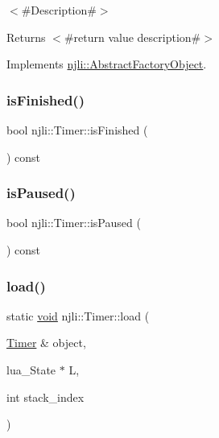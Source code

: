 $<$\#\+Description\#$>$

\begin{DoxyReturn}{Returns}
$<$\#return value description\#$>$ 
\end{DoxyReturn}


Implements \mbox{\hyperlink{classnjli_1_1_abstract_factory_object_a207c86146d40d0794708ae7f2d4e60a7}{njli\+::\+Abstract\+Factory\+Object}}.

\mbox{\label{classnjli_1_1_timer_a29750c69a007f00c7ecaf180b4fed52b}} 
\subsubsection{\texorpdfstring{is\+Finished()}{isFinished()}}
{\footnotesize\ttfamily bool njli\+::\+Timer\+::is\+Finished (\begin{DoxyParamCaption}{ }\end{DoxyParamCaption}) const}

\mbox{\label{classnjli_1_1_timer_a7184d3e27ef45550fbc07bb2580bb075}} 
\subsubsection{\texorpdfstring{is\+Paused()}{isPaused()}}
{\footnotesize\ttfamily bool njli\+::\+Timer\+::is\+Paused (\begin{DoxyParamCaption}{ }\end{DoxyParamCaption}) const}

\mbox{\label{classnjli_1_1_timer_acad9695415047e980e802f6048aefe6d}} 
\subsubsection{\texorpdfstring{load()}{load()}}
{\footnotesize\ttfamily static \mbox{\hyperlink{_thread_8h_af1e856da2e658414cb2456cb6f7ebc66}{void}} njli\+::\+Timer\+::load (\begin{DoxyParamCaption}\item[{\mbox{\hyperlink{classnjli_1_1_timer}{Timer}} \&}]{object,  }\item[{lua\+\_\+\+State $\ast$}]{L,  }\item[{int}]{stack\+\_\+index }\end{DoxyParamCaption})\hspace{0.3cm}{\ttfamily [static]}}

